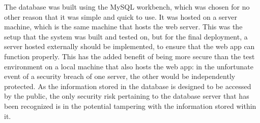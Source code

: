 \documentclass[11pt,a4paper]{book}
\begin{document}

The database was built using the MySQL workbench, which was chosen for no other reason that it was simple and quick to use. It was hosted on a server machine, which is the same machine that hosts the web server. This was the setup that the system was built and tested on, but for the final deployment, a server hosted externally should be  implemented, to ensure that the web app can function properly. This has the added benefit of being more secure than the test environment on a local machine that also hosts the web app: in the unfortunate event of a security breach of one server, the other would be independently protected. As the information stored in the database is designed to be accessed by the public, the only security risk pertaining to the database server that has been recognized is in the potential tampering with the information stored within it. 
\end{document}
